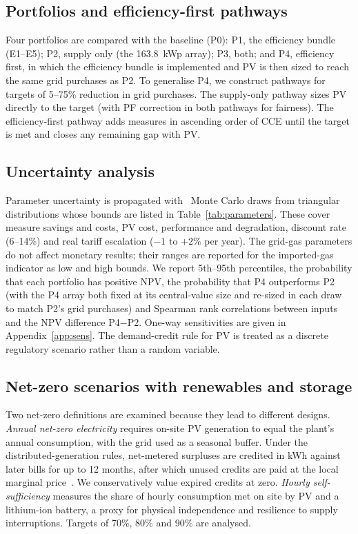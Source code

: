 \documentclass[processes,article,submit,pdftex,moreauthors]{Definitions/mdpi}
\begin{document}
\subsection{Portfolios and efficiency-first pathways}
Four portfolios are compared with the baseline (P0): P1, the efficiency bundle (E1--E5); P2, supply only (the 163.8~kWp array); P3, both; and P4, efficiency first, in which the efficiency bundle is implemented and PV is then sized to reach the same grid purchases as P2. To generalise P4, we construct pathways for targets of 5--75\% reduction in grid purchases. The supply-only pathway sizes PV directly to the target (with PF correction in both pathways for fairness). The efficiency-first pathway adds measures in ascending order of CCE until the target is met and closes any remaining gap with PV.

\subsection{Uncertainty analysis}
\label{sec:uncertainty}
Parameter uncertainty is propagated with \nMCN\ Monte Carlo draws from triangular distributions whose bounds are listed in Table~\ref{tab:parameters}. These cover measure savings and costs, PV cost, performance and degradation, discount rate (6--14\%) and real tariff escalation ($-1$ to $+2$\% per year). The grid-gas parameters do not affect monetary results; their ranges are reported for the imported-gas indicator as low and high bounds. We report 5th--95th percentiles, the probability that each portfolio has positive NPV, the probability that P4 outperforms P2 (with the P4 array both fixed at its central-value size and re-sized in each draw to match P2's grid purchases) and Spearman rank correlations between inputs and the NPV difference P4$-$P2. One-way sensitivities are given in Appendix~\ref{app:sens}. The demand-credit rule for PV is treated as a discrete regulatory scenario rather than a random variable.

\subsection{Net-zero scenarios with renewables and storage}
\label{sec:nzmethod}
Two net-zero definitions are examined because they lead to different designs. \emph{Annual net-zero electricity} requires on-site PV generation to equal the plant's annual consumption, with the grid used as a seasonal buffer. Under the distributed-generation rules, net-metered surpluses are credited in kWh against later bills for up to 12 months, after which unused credits are paid at the local marginal price~\cite{cre2017dg}. We conservatively value expired credits at zero. \emph{Hourly self-sufficiency} measures the share of hourly consumption met on site by PV and a lithium-ion battery, a proxy for physical independence and resilience to supply interruptions. Targets of 70\%, 80\% and 90\% are analysed.
\end{document}
